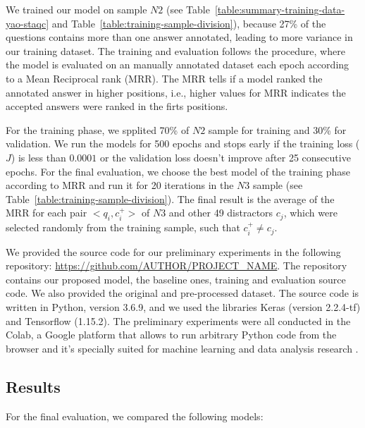 \documentclass[sigconf]{acmart}
\begin{document}
We trained our model on sample $N2$ (see Table~\ref{table:summary-training-data-yao-staqc} and Table~\ref{table:training-sample-division}), because 27\% of the questions contains more than one answer annotated, leading to more variance in our training dataset. The training and evaluation follows the \cite{iyer-etal-2016-summarizing} procedure, where the model is evaluated on an manually annotated dataset each epoch according to a Mean Reciprocal rank (MRR). The MRR tells if a model ranked the annotated answer in higher positions, i.e., higher values for MRR indicates the accepted answers were ranked in the firts positions.

For the training phase, we spplited 70\% of $N2$ sample for training and 30\% for validation. We run the models for 500 epochs and stops early if the training loss ($J$) is less than $0.0001$ or the validation loss doesn't improve after 25 consecutive epochs. For the final evaluation, we choose the best model of the training phase according to MRR and run it for 20 iterations in the $N3$ sample (see Table~\ref{table:training-sample-division}). The final result is the average of the MRR for each pair $<q_{i}, c_{i}^{+}>$ of $N3$ and other 49 distractors $c_{j}$, which were selected randomly from the training sample, such that $c_{i}^{+} \neq c_{j}$.

 We provided the source code for our preliminary experiments in the following repository: \url{https://github.com/AUTHOR/PROJECT_NAME}. The repository contains our proposed model, the baseline ones, training and evaluation source code. We also provided the original and pre-processed dataset. The source code is written in Python, version 3.6.9, and we used the libraries Keras (version 2.2.4-tf) and Tensorflow (1.15.2). The preliminary experiments were all conducted in the Colab, a Google platform that allows to run arbitrary Python code from the browser and it's specially suited for machine learning and data analysis research \cite{colab-2019}.

\subsection{Results}

For the final evaluation, we compared the following models:
\end{document}
